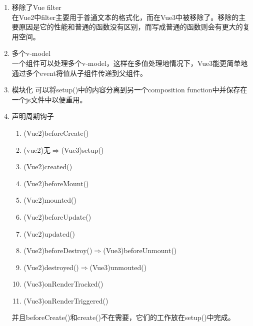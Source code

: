 \begin{enumerate}
\begin{enumerate}
        \item 移除了Vue filter\\
        在Vue2中filter主要用于普通文本的格式化，而在Vue3中被移除了。移除的主要原因是它的性能和普通的函数没有区别，而写成普通的函数则会有更大的复用空间。
        \item 多个v-model\\
        一个组件可以处理多个v-model，这样在多值处理地情况下，Vue3能更简单地通过多个event将值从子组件传递到父组件。
        \item 模块化
        可以将setup()中的内容分离到另一个composition function中并保存在一个js文件中以便重用。
        \item 声明周期钩子
            \begin{enumerate}
                \item (Vue2)beforeCreate()
                \item (vue2)无$\Rightarrow$(Vue3)setup()
                \item (Vue2)created()
                \item (Vue2)beforeMount()
                \item (Vue2)mounted()
                \item (Vue2)beforeUpdate()
                \item (Vue2)updated()
                \item (Vue2)beforeDestroy()$\Rightarrow$(Vue3)beforeUnmount()
                \item (Vue2)destroyed()$\Rightarrow$(Vue3)unmouted()
                \item (Vue3)onRenderTracked()
                \item (Vue3)onRenderTriggered()
            \end{enumerate}
            并且beforeCreate()和create()不在需要，它们的工作放在setup()中完成。
    \end{enumerate}
\end{enumerate}
